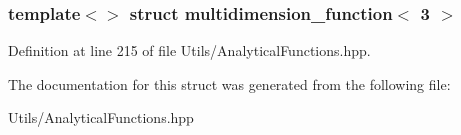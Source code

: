 \subsubsection*{template$<$$>$\newline
struct multidimension\+\_\+function$<$ 3 $>$}



Definition at line 215 of file Utils/\+Analytical\+Functions.\+hpp.



The documentation for this struct was generated from the following file\+:\begin{DoxyCompactItemize}
\item 
Utils/\+Analytical\+Functions.\+hpp\end{DoxyCompactItemize}
